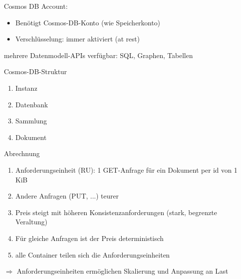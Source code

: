 

\begin{flashcard}[Definition]{Cosmos DB}
    Account:
    \begin{itemize}
        \item Benötigt Cosmos-DB-Konto (wie Speicherkonto)
        \item Verschlüsselung: immer aktiviert (at rest)
    \end{itemize}
    mehrere Datenmodell-APIs verfügbar: SQL, Graphen, Tabellen
\end{flashcard}

\begin{flashcard}[Definition]{Cosmos-DB-Struktur}
    \begin{enumerate}
        \item Instanz
        \item Datenbank
        \item Sammlung
        \item Dokument
    \end{enumerate}
\end{flashcard}

\begin{flashcard}[Definition]{Abrechnung}
    \begin{enumerate}
        \item Anforderungseinheit (RU): 1 GET-Anfrage für ein Dokument per id von 1 KiB
        \item Andere Anfragen (PUT, ...) teurer
        \item Preis steigt mit höheren Konsistenzanforderungen (stark, begrenzte Veraltung)
        \item Für gleiche Anfragen ist der Preis deterministisch
        \item alle Container teilen sich die Anforderungseinheiten
    \end{enumerate}
    $\Rightarrow$ Anforderungseinheiten ermöglichen Skalierung und Anpassung an Last
\end{flashcard}

